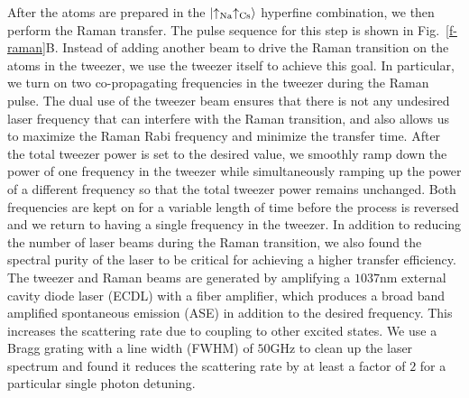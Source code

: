 \documentclass[aps,prl,twocolumn,superscriptaddress]{revtex4-1}
\begin{document}
After the atoms are prepared in the $\ket{\uparrow_{\text{Na}}\uparrow_{\text{Cs}}} $ hyperfine combination, we then perform the Raman transfer. The pulse sequence for this step is shown in Fig.~\ref{f-raman}B. Instead of adding another beam to drive the Raman transition on the atoms in the tweezer, we use the tweezer itself to achieve this goal. In particular, we turn on two co-propagating frequencies in the tweezer during the Raman pulse. The dual use of the tweezer beam ensures that there is not any undesired laser frequency that can interfere with the Raman transition, and also allows us to maximize the Raman Rabi frequency and minimize the transfer time. After the total tweezer power is set to the desired value, we smoothly ramp down the power of one frequency in the tweezer while simultaneously ramping up the power of a different frequency so that the total tweezer power remains unchanged. Both frequencies are kept on for a variable length of time before the process is reversed and we return to having a single frequency in the tweezer.
In addition to reducing the number of laser beams during the Raman transition,
we also found the spectral purity of the laser to be critical for achieving a higher
transfer efficiency. The tweezer and Raman beams are generated by amplifying a $1037 \mathrm{nm}$
external cavity diode laser (ECDL) with a fiber amplifier,
which produces a broad band amplified spontaneous emission (ASE)
in addition to the desired frequency. This increases the scattering rate due to coupling to
other excited states.
We use a Bragg grating with a line width (FWHM) of $50 \mathrm{GHz}$ to clean up the
laser spectrum and found it reduces the scattering rate by at least a factor of $2$
for a particular single photon detuning.

\end{document}
